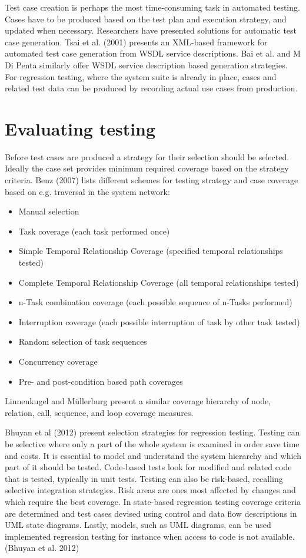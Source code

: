 \documentclass[12pt,a4paper,oneside,pdftex]{report}
\begin{document}
Test case creation is perhaps the most time-consuming task in automated testing. Cases have to be produced based on the test plan and execution strategy, and updated when necessary. Researchers have presented solutions for automatic test case generation. Tsai et al. (2001) presents an XML-based framework for automated test case generation from WSDL service descriptions. Bai et al. and M Di Penta similarly offer WSDL service description based generation strategies. For regression testing, where the system suite is already in place, cases and related test data can be produced by recording actual use cases from production.

\section{Evaluating testing}

Before test cases are produced a strategy for their selection should be selected. Ideally the case set provides minimum required coverage based on the strategy criteria. Benz (2007) lists different schemes for testing strategy and case coverage based on e.g. traversal in the system network:
\begin{itemize}
\item Manual selection
\item Task coverage (each task performed once)
\item Simple Temporal Relationship Coverage (specified temporal relationships tested)
\item Complete Temporal Relationship Coverage (all temporal relationships tested)
\item n-Task combination coverage (each possible sequence of n-Tasks performed)
\item Interruption coverage (each possible interruption of task by other task tested)
\item Random selection of task sequences
\item Concurrency coverage
\item Pre- and post-condition based path coverages
\end{itemize}

Linnenkugel and Müllerburg present a similar coverage hierarchy of node, relation, call, sequence, and loop coverage measures.

Bhuyan et al (2012) present selection strategies for regression testing. Testing can be selective where only a part of the whole system is examined in order save time and costs. It is essential to model and understand the system hierarchy and which part of it should be tested. Code-based tests look for modified and related code that is tested, typically in unit tests. Testing can also be risk-based, recalling selective integration strategies. Risk areas are ones most affected by changes and which require the best coverage. In state-based regression testing coverage criteria are determined and test cases devised using control and data flow descriptions in UML state diagrams. Lastly, models, such as UML diagrams, can be used implemented regression testing for instance when access to code is not available. (Bhuyan et al. 2012)
\end{document}
